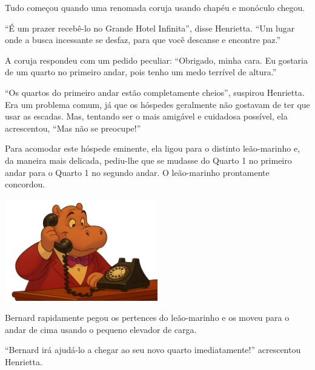 Tudo começou quando uma renomada coruja usando chapéu e monóculo chegou.

``É um prazer recebê-lo no Grande Hotel Infinita'', disse Henrietta. ``Um lugar onde a busca incessante se desfaz, para que você descanse e encontre paz.''

A coruja respondeu com um pedido peculiar: ``Obrigado, minha cara. Eu gostaria de um quarto no primeiro andar, pois tenho um medo terrível de altura.''

``Os quartos do primeiro andar estão completamente cheios'', suspirou Henrietta. Era um problema comum, já que os hóspedes geralmente não gostavam de ter que usar as escadas. Mas, tentando ser o mais amigável e cuidadosa possível, ela acrescentou, ``Mas não se preocupe!''

Para acomodar este hóspede eminente, ela ligou para o distinto leão-marinho e, da maneira mais delicada, pediu-lhe que se mudasse do Quarto 1 no primeiro andar para o Quarto 1 no segundo andar. O leão-marinho prontamente concordou.

\vfill
\begin{center}
\includegraphics[width=0.5\textwidth]{images/telephone.png}
\end{center}

\clearpage


Bernard rapidamente pegou os pertences do leão-marinho e os moveu para o andar de cima usando o pequeno elevador de carga.

``Bernard irá ajudá-lo a chegar ao seu novo quarto imediatamente!'' acrescentou Henrietta.

